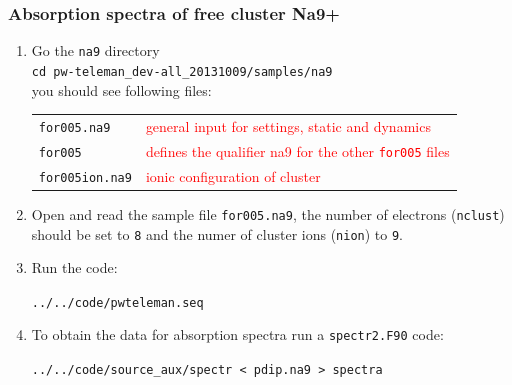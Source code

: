 \documentclass[10pt]{beamer}
\begin{document}
\begin{frame}
\frametitle{Absorption spectra of free cluster Na9+}
\begin{enumerate}
\item Go the {\tt na9} directory\\
\vspace*{0.2cm}
{\tt cd pw-teleman\_dev-all\_20131009/samples/na9}\\
\vspace*{0.2cm}
you should see following files:\\
\vspace*{0.2cm}
\begin{tabular}{ll}
{\tt for005.na9} &{\scriptsize{\textcolor{red}{general input for settings, static and dynamics}}}\\
{\tt for005}  &{\scriptsize{\textcolor{red}{defines the qualifier na9 for the other {\tt for005} files}}}\\
{\tt for005ion.na9}  &{\scriptsize{\textcolor{red}{ionic configuration of cluster}}}\\
\end{tabular}
\vspace*{0.4cm}


\item Open and read the sample file {\tt for005.na9}, the number of electrons ({\tt nclust}) should be set to {\tt 8} and the numer of cluster ions ({\tt nion}) to {\tt 9}. 

\item Run the code:

{\tt ../../code/pwteleman.seq}

\item To obtain the data for absorption spectra run a {\tt spectr2.F90} code:

\small{{\tt ../../code/source\_aux/spectr < pdip.na9 > spectra}}
\end{enumerate}

\end{frame}
\end{document}
